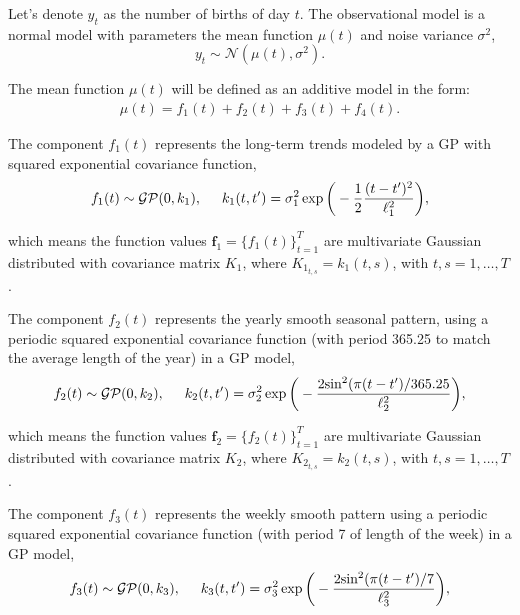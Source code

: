 \documentclass[onecolumn,a4paper,11pt]{article}
\begin{document}
Let's denote $y_t$ as the number of births of day $t$. The observational model is a normal model with parameters the mean function $\mu(t)$ and noise variance $\sigma^2$,
%
\begin{equation*}
y_{t} \sim \mathcal{N}(\mu(t),\sigma^2).
\end{equation*}

\noindent The mean function $\mu(t)$ will be defined as an additive model in the form: 
%
\begin{eqnarray} \label{ch5_eq_mean_brithday}
\mu(t) = f_1(t) + f_2(t) + f_3(t) + f_4(t).
\end{eqnarray}

The component $f_1(t)$ represents the long-term trends modeled by a GP with squared exponential covariance function,
%
\begin{eqnarray*}
f_1(t) \sim \mathcal{GP}(0,k_1), \hspace{5mm} k_1(t,t') = \sigma_1^2 \exp\bigg(-\frac{1}{2} \frac{(t-t')^2}{\ell_1^2}\bigg), 
\end{eqnarray*}

\noindent which means the function values $\bm{f}_1=\{f_1(t)\}_{t=1}^T$ are multivariate Gaussian distributed with covariance matrix $K_1$, where $K_{1_{t,s}}=k_1(t,s)$, with $t,s=1,\dots,T$.

The component $f_2(t)$ represents the yearly smooth seasonal pattern, using a periodic squared exponential covariance function (with period 365.25 to match the average length of the year) in a GP model,
%
\begin{eqnarray*}
f_2(t) \sim \mathcal{GP}(0,k_2), \hspace{5mm} k_2(t,t') = \sigma_2^2 \exp\bigg(-\frac{2\text{sin}^2(\pi(t-t')/365.25}{\ell_2^2}\bigg), 
\end{eqnarray*}

\noindent which means the function values $\bm{f}_2=\{f_2(t)\}_{t=1}^T$ are multivariate Gaussian distributed with covariance matrix $K_2$, where $K_{2_{t,s}}=k_2(t,s)$, with $t,s=1,\dots,T$.

The component $f_3(t)$ represents the weekly smooth pattern using a periodic squared exponential covariance function (with period 7 of length of the week) in a GP model,
%
\begin{eqnarray*}
f_3(t) \sim \mathcal{GP}(0,k_3), \hspace{5mm} k_3(t,t') = \sigma_3^2 \exp\bigg(-\frac{2\text{sin}^2(\pi(t-t')/7}{\ell_3^2}\bigg), 
\end{eqnarray*}
\end{document}
